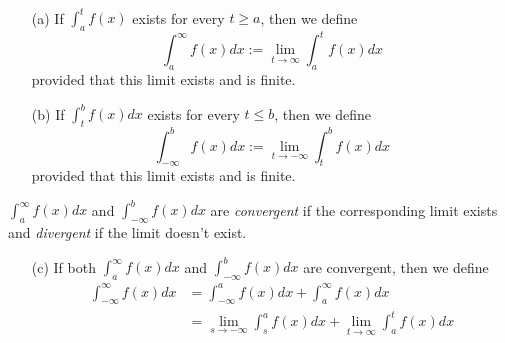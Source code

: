 \begin{definition} \ \\
  \begin{enumerate}
    \item[(a)] If $\int_a^t f(x)$ exists for every $t \geq a$, then we define
    \[
      \int_a^\infty f(x) dx := \lim_{t \to \infty} \int_a^t f(x) dx
    \]
    provided that this limit exists and is finite.

    \item[(b)] If $\int_t^b f(x) dx$ exists for every $t \leq b$, then we define
    \[
      \int_{-\infty}^b f(x)dx := \lim_{t \to -\infty} \int_t^b f(x)dx
    \]
    provided that this limit exists and is finite.
  \end{enumerate}

  $\int_a^\infty f(x)dx$ and $\int_{-\infty}^b f(x)dx$ are \textit{convergent} if the corresponding limit exists and \textit{divergent} if the limit doesn't exist.

  \begin{enumerate}
    \item[(c)] If both $\int_a^\infty f(x)dx$ and $\int_{-\infty}^b f(x)dx$ are convergent, then we define
    \begin{align*}
      \int_{-\infty}^{\infty} f(x)dx &= \int_{-\infty}^a f(x) dx + \int_a^\infty f(x) dx \\
                              &= \lim_{s \to -\infty} \int_s^a f(x) dx + \lim_{t \to \infty} \int_a^t f(x) dx
    \end{align*}
  \end{enumerate}
\end{definition}

